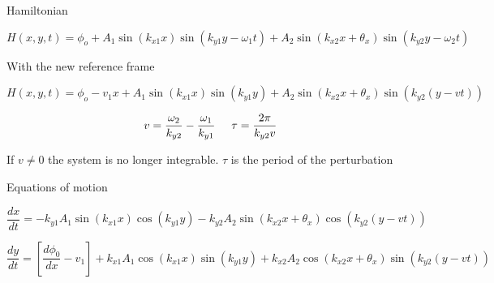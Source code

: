 \documentclass[10pt]{beamer}
\begin{document}
\begin{frame}{Hamiltonian}

\begin{equation}
H(x,y,t) = \phi_o + A_1 \sin(k_{x1}x)\sin(k_{y1}y - \omega_1t) + A_2 \sin(k_{x2}x + \theta_x)\sin(k_{y2}y - \omega_2t)
\label{2waveh}
\end{equation}

With the new reference frame 

\begin{equation}
H(x,y,t) = \phi_o - v_1x + A_1 \sin(k_{x1}x)\sin(k_{y1}y) + A_2 \sin(k_{x2}x + \theta_x)\sin(k_{y2}(y - vt))
\label{2waveh}
\end{equation}

\begin{equation}
    v = \frac{\omega_2}{k_{y2}} - \frac{\omega_1}{k_{y1}} \hspace{0.5cm} \tau = \frac{2\pi}{k_{y2}v}
\end{equation}

If $v \neq 0$ the system is no longer integrable. $\tau$ is the period of the perturbation

\end{frame}

\begin{frame}{Equations of motion}

\begin{small}

\begin{equation}
\frac{dx}{dt} = - k_{y1} A_1 \sin(k_{x1}x)\cos(k_{y1}y) - k_{y2} A_2 \sin(k_{x2}x+\theta_x)\cos(k_{y2}(y - vt))
\label{2wavex}
\end{equation}

\begin{equation}
\frac{dy}{dt} = \left[ \frac{d\phi_0}{dx} - v_1 \right] +  k_{x1} A_1 \cos(k_{x1}x)\sin(k_{y1}y) + k_{x2} A_2 \cos(k_{x2}x + \theta_x)\sin(k_{y2}(y - vt))
\label{2wavey}
\end{equation}
\end{small}


\end{frame}
\end{document}

